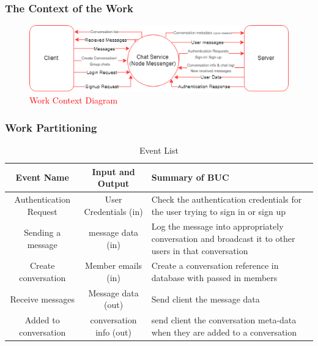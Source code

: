 \documentclass[12pt, titlepage]{article}
\begin{document}
    	\subsubsection{The Context of the Work}
    	\begin{figure}[H]
                \centering
                \includegraphics[scale=0.8]{ContextDiagram.png}
                \caption{\textcolor{red}{Work Context Diagram}}
                \label{fig:my_label}
        \end{figure}
    	
        \subsubsection{Work Partitioning}
        \begin{table}[!htbp]
           \begin{tabular}{|c|c|p{4cm}|}
    		\hline 
    		\textbf{Event Name} & \textbf{Input and Output} & \textbf{Summary of BUC} \\ 
    		\hline 
    		Authentication Request & User Credentials (in) & Check the authentication credentials for the user trying to sign in or sign up \\ 
    		\hline 
    		Sending a message & message data (in) & Log the message into appropriately conversation and broadcast it to other users in that conversation \\ 
    		\hline 
    		Create conversation & Member emails (in) & Create a conversation reference in database with passed in members \\ 
    		\hline 
    		Receive messages & Message data (out) &  Send client the message data\\ 
    		\hline 
    		Added to conversation & conversation info (out) & send client the conversation meta-data when they are added to a conversation \\ 
    		\hline 
    	\end{tabular} 
            \caption{Event List}
            \label{tab:my_label}
        \end{table}
       
    
\end{document}

